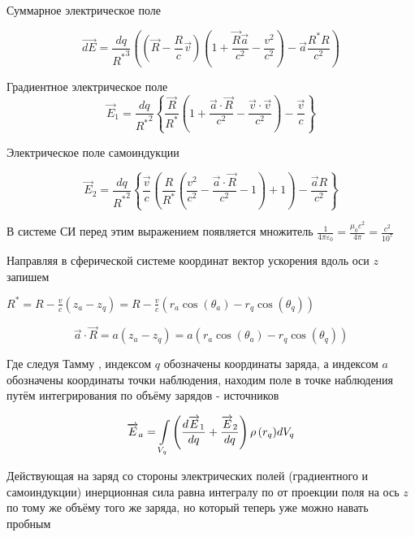 \documentclass{article}
\begin{document}
Суммарное электрическое поле

$$\vec{dE} = \frac{dq}{{{R}^{*}}^{3}}\left( \left(\vec{R}-\frac{R}{c}\vec{v} \right) \left(1 + \frac{\vec{R}\vec{a}}{c^2} - \frac{v^2}{c^2} \right) - \vec{a}\frac{{R}^{*}R}{c^2} \right)$$

Градиентное электрическое поле
	\[\overrightarrow{E}_{1}=\frac{dq}{{{R}^{*}}^{2}}\left\{ \frac{\overrightarrow{R}}{{{R}^{*}}}\left( 1+\frac{\overrightarrow{a}\cdot \overrightarrow{R}}{{{c}^{2}}}-\frac{\overrightarrow{v}\cdot \overrightarrow{v}}{{{c}^{2}}} \right)-\frac{\overrightarrow{v}}{c} \right\}\] 	


Электрическое поле самоиндукции

\[\overrightarrow{E}_{2}=\frac{dq}{{{R}^{*}}^{2}}\left\{ \frac{\overrightarrow{v}}{c}\left( \frac{R}{{{R}^{*}}}\left( \frac{{{v}^{2}}}{{{c}^{2}}}-\frac{\overrightarrow{a}\cdot \overrightarrow{R}}{{{c}^{2}}}-1 \right)+1 \right)-\frac{\overrightarrow{a}R}{{{c}^{2}}} \right\}\]

В системе СИ перед этим выражением появляется множитель $\frac{1}{4\pi {{\varepsilon }_{0}}}=\frac{{{\mu }_{0}}{{c}^{2}}}{4\pi }=\frac{{{c}^{2}}}{{{10}^{7}}}$

Направляя в сферической системе координат вектор ускорения вдоль оси $z$  запишем

${{R}^{*}}=R-\frac{v}{c}\left( {{z}_{a}}-{{z}_{q}} \right)=R-\frac{v}{c}\left( {{r}_{a}}\cos \left( {{\theta }_{a}} \right)-{{r}_{q}}\cos \left( {{\theta }_{q}} \right) \right)$

\[\overrightarrow{a}\cdot \overrightarrow{R}=a\left( {{z}_{a}}-{{z}_{q}} \right)=a\left( {{r}_{a}}\cos \left( {{\theta }_{a}} \right)-{{r}_{q}}\cos \left( {{\theta }_{q}} \right) \right)\]

Где следуя Тамму \cite{tamm}, индексом $q$ обозначены координаты заряда, а индексом $a$ обозначены координаты точки наблюдения, находим поле в точке наблюдения путём интегрирования по объёму зарядов - источников

\[\overrightarrow{E}_{a}=\int\limits_{{{V}_{q}}}\\
{\left(\frac{d\overrightarrow{E}_{1}}{dq}+\frac{\overrightarrow{E}_{2}}{dq}\right)\rho \left( {{r}_{q}} \right) }d{{V }_{q}}\]


Действующая на заряд со стороны электрических полей (градиентного и самоиндукции) инерционная сила равна интегралу по от проекции поля на ось $z$ по тому же объёму того же заряда, но который теперь уже можно навать пробным 
\end{document}
